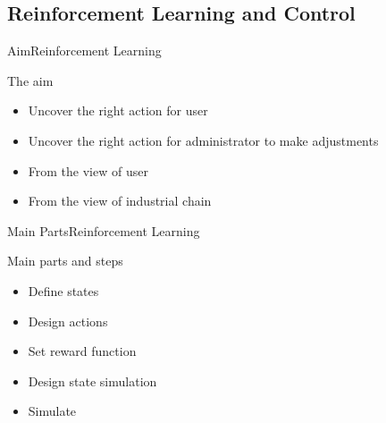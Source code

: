 \subsection{Reinforcement Learning and Control} %
\label{sub:reinforcement_learning_and_control}
\begin{frame}{Aim}{Reinforcement Learning}
\begin{block}{The aim}
\begin{itemize}
	\item Uncover the right action for user
	\item Uncover the right action for administrator to make adjustments
	\item From the view of user
	\item From the view of industrial chain
\end{itemize}
\end{block}
\end{frame}

\begin{frame}{Main Parts}{Reinforcement Learning}
\begin{block}{Main parts and steps}
\begin{itemize}
	\item Define states
	\item Design actions
	\item Set reward function
	\item Design state simulation
	\item Simulate
\end{itemize}
\end{block}
\end{frame}
\fi
